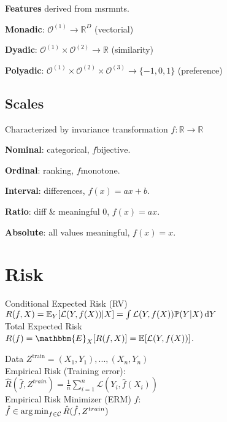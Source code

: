 \textbf{Features} derived from msrmnts.

\textbf{Monadic}: $\mathcal{O}^{(1)} \rightarrow \mathbb{R}^D$ (vectorial)

\textbf{Dyadic}: $\mathcal{O}^{(1)}\times\mathcal{O}^{(2)} \rightarrow \mathbb{R}$ (similarity)

\textbf{Polyadic}: $\mathcal{O}^{(1)}\times\mathcal{O}^{(2)}\times\mathcal{O}^{(3)} \rightarrow \{-1, 0, 1\}$ (preference)

\subsection*{Scales}

Characterized by invariance transformation $f: \mathbb{R} \rightarrow \mathbb{R}$

\textbf{Nominal}: categorical, $f \textrm{bijective}$.

\textbf{Ordinal}: ranking, $f \textrm{monotone}$.

\textbf{Interval}: differences, $f(x) = ax + b$.

\textbf{Ratio}: diff \& meaningful 0, $f(x) = ax$.

\textbf{Absolute}: all values meaningful, $f(x) = x$. 

\section*{Risk}
Conditional Expected Risk (RV)\\
$R(f, X) = \mathbb{E}_Y[\mathcal{L}(Y,f(X))|X] = \int \mathcal{L}(Y,f(X))\mathbb{P}(Y|X)\operatorname{d\!} Y$\\
Total Expected Risk\\
$R(f) = \mathbbm{E}_{X}[R(f,X)] = \E[\mathcal{L}(Y, f(X))]$.

Data $Z^\text{train}={(X_1,Y_1),...,(X_n,Y_n)}$ \\
Empirical Risk (Training error):\\
$\hat{R}(\hat{f}, Z^{train}) = \frac{1}{n} \sum_{i=1}^n \mathcal{L}(Y_i, \hat{f}(X_i))$\\
Empirical Risk Minimizer (ERM) $\hat{f}$:\\
$\hat{f} \in \operatorname*{arg\,min}_{f \in \mathcal{C}} \hat{R}(\hat{f}, Z^{train})$\\

